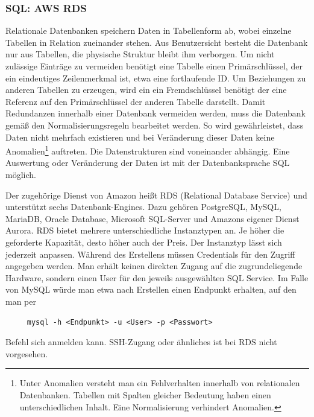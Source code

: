\subsubsection{SQL: AWS RDS}

Relationale Datenbanken speichern Daten in Tabellenform ab, wobei einzelne Tabellen in Relation zueinander stehen.
Aus Benutzersicht besteht die Datenbank nur aus Tabellen, die physische Struktur bleibt ihm verborgen.
Um nicht zulässige Einträge zu vermeiden benötigt eine Tabelle einen Primärschlüssel, der ein eindeutiges Zeilenmerkmal ist, etwa eine
fortlaufende ID. Um Beziehungen zu anderen Tabellen zu erzeugen, wird ein ein Fremdschlüssel benötigt der eine Referenz auf den Primärschlüssel der anderen Tabelle darstellt.
Damit Redundanzen innerhalb einer Datenbank vermeiden werden, muss die Datenbank gemäß den Normalisierungsregeln bearbeitet werden. So wird gewährleistet, dass Daten nicht mehrfach existieren
und bei Veränderung dieser Daten keine Anomalien\footnote{Unter Anomalien versteht man ein Fehlverhalten innerhalb von relationalen Datenbanken. Tabellen
mit Spalten gleicher Bedeutung haben einen unterschiedlichen Inhalt. Eine Normalisierung verhindert Anomalien. } auftreten.
Die Datenstrukturen sind voneinander abhängig. Eine Auswertung oder Veränderung der Daten ist mit der Datenbanksprache SQL möglich. \cite[]{Datenbankvergleich}

Der zugehörige Dienst von Amazon heißt RDS (Relational Database Service) und unterstützt sechs Datenbank-Engines. Dazu gehören
PostgreSQL, MySQL, MariaDB, Oracle Database, Microsoft SQL-Server und Amazons eigener Dienst Aurora.
RDS bietet mehrere unterschiedliche Instanztypen an. Je höher die geforderte Kapazität, desto höher auch der Preis.
Der Instanztyp lässt sich jederzeit anpassen. Während des Erstellens müssen Credentials für den Zugriff angegeben werden. Man erhält keinen
direkten Zugang auf die zugrundeliegende Hardware, sondern einen User für den jeweils ausgewählten SQL Service. Im Falle von MySQL würde man etwa nach Erstellen
einen Endpunkt erhalten, auf den man per
\begin{lstlisting}
     mysql -h <Endpunkt> -u <User> -p <Passwort>
    \end{lstlisting} Befehl sich anmelden kann. SSH-Zugang oder ähnliches ist bei RDS nicht vorgesehen.

